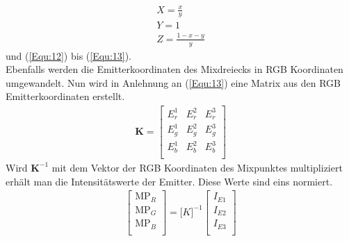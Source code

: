 \documentclass[11pt]{scrartcl}
\begin{document}
\begin{align}\label{Equ:19}
    X = \frac{x}{y}\\
    Y = 1\\
    Z = \frac{1-x-y}{y}
\end{align}
und (\ref{Equ:12}) bis (\ref{Equ:13}).\\
Ebenfalls werden die Emitterkoordinaten des Mixdreiecks in RGB Koordinaten umgewandelt. Nun wird in Anlehnung an (\ref{Equ:13}) eine Matrix aus den RGB
Emitterkoordinaten erstellt.
\begin{align}\label{Equ:20}
    \mathbf K = \left[ \begin{array}{rrr}
        E^1_r  & E^2_r & E^3_r \\
        E^1_g  & E^2_g & E^3_g \\
        E^1_b  & E^2_b & E^3_b \\
    \end{array}\right]
\end{align}
Wird $\mathbf K^{-1}$ mit dem Vektor der RGB Koordinaten des Mixpunktes multipliziert erhält man die Intensitätswerte der Emitter. Diese Werte sind eins normiert.
\begin{align}\label{Equ:21}
    \left[ \begin{array}{r}
        \text{MP}_R \\
        \text{MP}_G \\
        \text{MP}_B \\
    \end{array}\right]
    = {\mathbf [K]^{-1}} \left[ \begin{array}{r}
        I_{E1} \\
        I_{E2} \\
        I_{E3} \\
    \end{array}\right]
\end{align}
\end{document}

